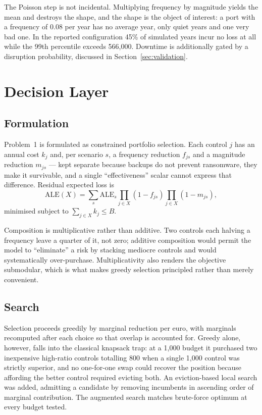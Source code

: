 \documentclass[conference]{IEEEtran}
\newcommand{\eur}{\mbox{\texteuro}}
\begin{document}
The Poisson step is not incidental. Multiplying frequency by magnitude yields the
mean and destroys the shape, and the shape is the object of interest: a port with a
frequency of 0.08 per year has no average year, only quiet years and one very bad
one. In the reported configuration 45\% of simulated years incur no loss at all
while the 99th percentile exceeds \eur{}566{,}000. Downtime is additionally gated by
a disruption probability, discussed in Section~\ref{sec:validation}.

\section{Decision Layer}

\subsection{Formulation}

Problem~1 is formulated as constrained portfolio selection. Each control $j$ has an
annual cost $k_j$ and, per scenario $s$, a frequency reduction $f_{js}$ and a
magnitude reduction $m_{js}$ --- kept separate because backups do not prevent
ransomware, they make it survivable, and a single ``effectiveness'' scalar cannot
express that difference. Residual expected loss is
\begin{equation}
\textrm{ALE}(X) = \sum_{s} \textrm{ALE}_s
\prod_{j \in X}(1 - f_{js}) \prod_{j \in X}(1 - m_{js}),
\end{equation}
minimised subject to $\sum_{j \in X} k_j \le B$.

Composition is multiplicative rather than additive. Two controls each halving a
frequency leave a quarter of it, not zero; additive composition would permit the
model to ``eliminate'' a risk by stacking mediocre controls and would systematically
over-purchase. Multiplicativity also renders the objective submodular, which is what
makes greedy selection principled rather than merely convenient.

\subsection{Search}

Selection proceeds greedily by marginal reduction per euro, with marginals
recomputed after each choice so that overlap is accounted for. Greedy alone,
however, falls into the classical knapsack trap: at a \eur{}1{,}000 budget it
purchased two inexpensive high-ratio controls totalling \eur{}800 when a single
\eur{}1{,}000 control was strictly superior, and no one-for-one swap could recover
the position because affording the better control required evicting both. An
eviction-based local search was added, admitting a candidate by removing incumbents
in ascending order of marginal contribution. The augmented search matches
brute-force optimum at every budget tested.
\end{document}
